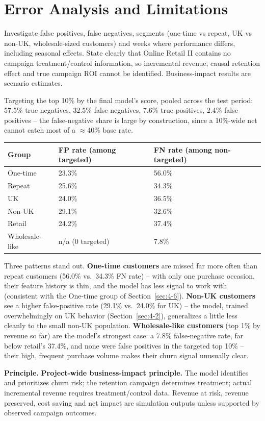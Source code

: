 \section{Error Analysis and Limitations}
\label{sec:7-12}

Investigate false positives, false negatives, segments (one-time vs repeat, UK vs non-UK, wholesale-sized customers) and weeks where performance differs, including seasonal effects. State clearly that Online Retail II contains no campaign treatment/control information, so incremental revenue, causal retention effect and true campaign ROI cannot be identified. Business-impact results are scenario estimates.

Targeting the top 10\% by the final model's score, pooled across the test period: 57.5\% true negatives, 32.5\% false negatives, 7.6\% true positives, 2.4\% false positives -- the false-negative share is large by construction, since a 10\%-wide net cannot catch most of a $\approx$40\% base rate.

\begin{center}
\begin{tabular}{@{}p{3.6cm}p{2.6cm}p{2.6cm}@{}}
    \toprule
    Group & FP rate (among targeted) & FN rate (among non-targeted) \\
    \midrule
    One-time & 23.3\% & 56.0\% \\
    Repeat & 25.6\% & 34.3\% \\
    \midrule
    UK & 24.0\% & 36.5\% \\
    Non-UK & 29.1\% & 32.6\% \\
    \midrule
    Retail & 24.2\% & 37.4\% \\
    Wholesale-like & n/a (0 targeted) & 7.8\% \\
    \bottomrule
\end{tabular}
\end{center}

Three patterns stand out. \textbf{One-time customers} are missed far more often than repeat customers (56.0\% vs.\ 34.3\% FN rate) -- with only one purchase occasion, their feature history is thin, and the model has less signal to work with (consistent with the One-time group of Section~\ref{sec:4-6}). \textbf{Non-UK customers} see a higher false-positive rate (29.1\% vs.\ 24.0\% for UK) -- the model, trained overwhelmingly on UK behavior (Section~\ref{sec:4-2}), generalizes a little less cleanly to the small non-UK population. \textbf{Wholesale-like customers} (top 1\% by revenue so far) are the model's strongest case: a 7.8\% false-negative rate, far below retail's 37.4\%, and none were false positives in the targeted top 10\% -- their high, frequent purchase volume makes their churn signal unusually clear.

\textbf{Principle.} \textbf{Project-wide business-impact principle.} The model identifies and prioritizes churn risk; the retention campaign determines treatment; actual incremental revenue requires treatment/control data. Revenue at risk, revenue preserved, cost saving and net impact are simulation outputs unless supported by observed campaign outcomes.
